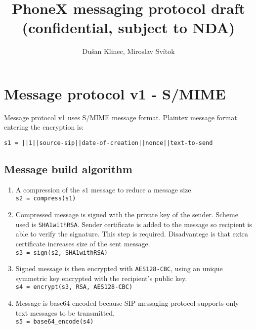 \documentclass[a4paper,10pt]{article}
\title{PhoneX messaging protocol draft \\ (confidential, subject to NDA)}
\author{Du\v{s}an Klinec, Miroslav Sv\'{i}tok}
\begin{document}
\maketitle

\section{Message protocol v1 - S/MIME}
Message protocol v1 uses S/MIME message format. 
Plaintex message format entering the encryption is: 

\begin{center}
  \verb#s1 = ||1||source-sip||date-of-creation||nonce||text-to-send# 
\end{center}

\subsection{Message build algorithm}
\begin{enumerate}
 \item A compression of the $s1$ message to reduce a message size.\\
 \verb#s2 = compress(s1)#
 
 \item Compressed message is signed with the private key of the sender. Scheme used is \verb#SHA1withRSA#. 
 Sender certificate is added to the message so recipient is able to verify the signature. This step is required. Disadvantege is 
 that extra certificate increases size of the sent message.\\
 \verb#s3 = sign(s2, SHA1withRSA)#
 
 \item Signed message is then encrypted with \verb#AES128-CBC#, using an unique symmetric key encrypted with the recipient's public key.\\
 \verb#s4 = encrypt(s3, RSA, AES128-CBC)#
 
 \item Message is base64 encoded because SIP messaging protocol supports only text messages to be transmitted.\\
 \verb#s5 = base64_encode(s4)#
 
\end{enumerate}
\end{document}
